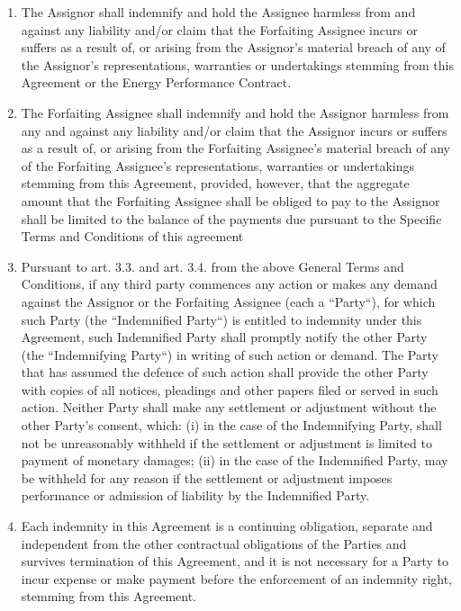\documentclass[a4paper]{article}
\begin{document}
\begin{multicols}{2}
\begin{enumerate}
  \item{The Assignor shall indemnify and hold the Assignee harmless
      from and against any liability and/or claim that the Forfaiting
      Assignee incurs or suffers as a result of, or arising from the
      Assignor's material breach of any of the Assignor's
      representations, warranties or undertakings stemming from this
      Agreement or the Energy Performance Contract.}

  \item{The Forfaiting Assignee shall indemnify and hold the Assignor
      harmless from any and against any liability and/or claim that
      the Assignor incurs or suffers as a result of, or arising from
      the Forfaiting Assignee’s material breach of any of the
      Forfaiting Assignee’s representations, warranties or
      undertakings stemming from this Agreement, provided, however,
      that the aggregate amount that the Forfaiting Assignee shall be
      obliged to pay to the Assignor shall be limited to the balance
      of the payments due pursuant to the Specific Terms and
      Conditions of this agreement }

  \item{Pursuant to art. 3.3. and art. 3.4. from the above General
      Terms and Conditions, if any third party commences any action or
      makes any demand against the Assignor or the Forfaiting Assignee
      (each a “Party“), for which such Party (the “Indemnified Party“)
      is entitled to indemnity under this Agreement, such Indemnified
      Party shall promptly notify the other Party (the “Indemnifying
      Party“) in writing of such action or demand. The Party that has
      assumed the defence of such action shall provide the other Party
      with copies of all notices, pleadings and other papers filed or
      served in such action. Neither Party shall make any settlement
      or adjustment without the other Party's consent, which: (i) in
      the case of the Indemnifying Party, shall not be unreasonably
      withheld if the settlement or adjustment is limited to payment
      of monetary damages; (ii) in the case of the Indemnified Party,
      may be withheld for any reason if the settlement or adjustment
      imposes performance or admission of liability by the Indemnified
      Party.}

  \item{Each indemnity in this Agreement is a continuing obligation,
      separate and independent from the other contractual obligations
      of the Parties and survives termination of this Agreement, and
      it is not necessary for a Party to incur expense or make payment
      before the enforcement of an indemnity right, stemming from this
      Agreement. }


\end{enumerate}
\end{multicols}
\end{document}
